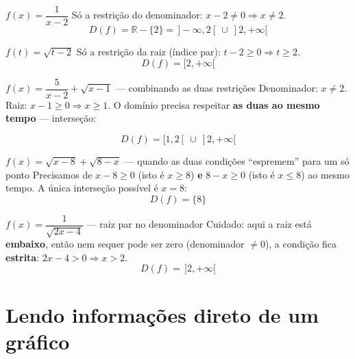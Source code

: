 \documentclass[12pt,a4paper]{article}
\newcommand{\bolaFechada}[1]{\filldraw[blue] (#1,0) circle (2.2pt);}
\begin{document}
\begin{exemplo}{$f(x) = \dfrac{1}{x-2}$}
Só a restrição do denominador: $x-2\neq0 \Rightarrow x\neq2$.
\[
D(f) = \mathbb{R}-\{2\} = \,]-\infty,2[\ \cup\ ]2,+\infty[
\]
\end{exemplo}

\begin{exemplo}{$f(t)=\sqrt{t-2}$}
Só a restrição da raiz (índice par): $t-2\ge0 \Rightarrow t\ge2$.
\[
D(f) = [2,+\infty[
\]
\end{exemplo}

\begin{exemplo}{$f(x) = \dfrac{5}{x-2}+\sqrt{x-1}$ — combinando as duas restrições}
Denominador: $x\neq2$. Raiz: $x-1\ge0 \Rightarrow x\ge1$. O domínio precisa
respeitar \textbf{as duas ao mesmo tempo} — interseção:
\begin{center}
\end{center}
\[
D(f) = [1,2[\ \cup\ ]2,+\infty[
\]
\end{exemplo}

\begin{exemplo}{$f(x)=\sqrt{x-8}+\sqrt{8-x}$ — quando as duas condições ``espremem'' para um só ponto}
Precisamos de $x-8\ge0$ (isto é $x\ge8$) \textbf{e} $8-x\ge0$ (isto é
$x\le8$) ao mesmo tempo. A única interseção possível é $x=8$:
\[
D(f)=\{8\}
\]
\end{exemplo}

\begin{exemplo}{$f(x)=\dfrac{1}{\sqrt{2x-4}}$ — raiz par no denominador}
Cuidado: aqui a raiz está \textbf{embaixo}, então nem sequer pode ser
zero (denominador $\neq0$), a condição fica \textbf{estrita}: $2x-4>0
\Rightarrow x>2$.
\[
D(f) = \,]2,+\infty[
\]
\end{exemplo}

\section{Lendo informações direto de um gráfico}
\end{document}
